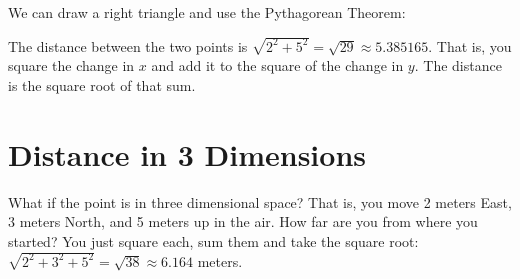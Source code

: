 We can draw a right triangle and use the Pythagorean Theorem:



The distance between the two points is $\sqrt{2^2 + 5^2} = \sqrt{29}
\approx 5.385165$. That is, you square the change in $x$ and add it to
the square of the change in $y$. The distance is the square root of
that sum.

\section{Distance in 3 Dimensions}

What if the point is in three dimensional space?  That is, you move 2
meters East, 3 meters North, and 5 meters up in the air. How far are
you from where you started?  You just square each, sum them and take the square root:
$\sqrt{2^2 + 3^2 + 5^2} = \sqrt{38} \approx 6.164$ meters.
